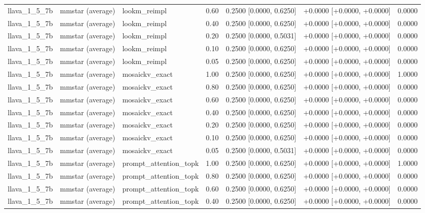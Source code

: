 \begin{longtable}{lllrrrr}
llava\_1\_5\_7b & mmstar (average) & lookm\_reimpl & 0.60 & 0.2500 [0.0000, 0.6250] & +0.0000 [+0.0000, +0.0000] & 0.0000 \\
llava\_1\_5\_7b & mmstar (average) & lookm\_reimpl & 0.40 & 0.2500 [0.0000, 0.6250] & +0.0000 [+0.0000, +0.0000] & 0.0000 \\
llava\_1\_5\_7b & mmstar (average) & lookm\_reimpl & 0.20 & 0.2500 [0.0000, 0.5031] & +0.0000 [+0.0000, +0.0000] & 0.0000 \\
llava\_1\_5\_7b & mmstar (average) & lookm\_reimpl & 0.10 & 0.2500 [0.0000, 0.6250] & +0.0000 [+0.0000, +0.0000] & 0.0000 \\
llava\_1\_5\_7b & mmstar (average) & lookm\_reimpl & 0.05 & 0.2500 [0.0000, 0.6250] & +0.0000 [+0.0000, +0.0000] & 0.0000 \\
llava\_1\_5\_7b & mmstar (average) & mosaickv\_exact & 1.00 & 0.2500 [0.0000, 0.6250] & +0.0000 [+0.0000, +0.0000] & 1.0000 \\
llava\_1\_5\_7b & mmstar (average) & mosaickv\_exact & 0.80 & 0.2500 [0.0000, 0.6250] & +0.0000 [+0.0000, +0.0000] & 0.0000 \\
llava\_1\_5\_7b & mmstar (average) & mosaickv\_exact & 0.60 & 0.2500 [0.0000, 0.6250] & +0.0000 [+0.0000, +0.0000] & 0.0000 \\
llava\_1\_5\_7b & mmstar (average) & mosaickv\_exact & 0.40 & 0.2500 [0.0000, 0.6250] & +0.0000 [+0.0000, +0.0000] & 0.0000 \\
llava\_1\_5\_7b & mmstar (average) & mosaickv\_exact & 0.20 & 0.2500 [0.0000, 0.6250] & +0.0000 [+0.0000, +0.0000] & 0.0000 \\
llava\_1\_5\_7b & mmstar (average) & mosaickv\_exact & 0.10 & 0.2500 [0.0000, 0.6250] & +0.0000 [+0.0000, +0.0000] & 0.0000 \\
llava\_1\_5\_7b & mmstar (average) & mosaickv\_exact & 0.05 & 0.2500 [0.0000, 0.5031] & +0.0000 [+0.0000, +0.0000] & 0.0000 \\
llava\_1\_5\_7b & mmstar (average) & prompt\_attention\_topk & 1.00 & 0.2500 [0.0000, 0.6250] & +0.0000 [+0.0000, +0.0000] & 1.0000 \\
llava\_1\_5\_7b & mmstar (average) & prompt\_attention\_topk & 0.80 & 0.2500 [0.0000, 0.6250] & +0.0000 [+0.0000, +0.0000] & 0.0000 \\
llava\_1\_5\_7b & mmstar (average) & prompt\_attention\_topk & 0.60 & 0.2500 [0.0000, 0.6250] & +0.0000 [+0.0000, +0.0000] & 0.0000 \\
llava\_1\_5\_7b & mmstar (average) & prompt\_attention\_topk & 0.40 & 0.2500 [0.0000, 0.6250] & +0.0000 [+0.0000, +0.0000] & 0.0000 \\

\end{longtable}
